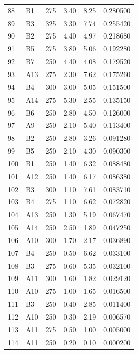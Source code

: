 \begin{longtable}{C{0.07\textwidth}C{0.08\textwidth}C{0.11\textwidth}C{0.18\textwidth}C{0.18\textwidth}C{0.18\textwidth}}
88 & B1 & 275 & 3.40 & 8.25 & 0.280500 \\
89 & B3 & 325 & 3.30 & 7.74 & 0.255420 \\
90 & B2 & 275 & 4.40 & 4.97 & 0.218680 \\
91 & B5 & 275 & 3.80 & 5.06 & 0.192280 \\
92 & B7 & 250 & 4.40 & 4.08 & 0.179520 \\
93 & A13 & 275 & 2.30 & 7.62 & 0.175260 \\
94 & B4 & 300 & 3.00 & 5.05 & 0.151500 \\
95 & A14 & 275 & 5.30 & 2.55 & 0.135150 \\
96 & B6 & 250 & 2.80 & 4.50 & 0.126000 \\
97 & A9 & 250 & 2.10 & 5.40 & 0.113400 \\
98 & B2 & 250 & 2.80 & 3.26 & 0.091280 \\
99 & B5 & 250 & 2.10 & 4.30 & 0.090300 \\
100 & B1 & 250 & 1.40 & 6.32 & 0.088480 \\
101 & A12 & 250 & 1.40 & 6.17 & 0.086380 \\
102 & B3 & 300 & 1.10 & 7.61 & 0.083710 \\
103 & B4 & 275 & 1.10 & 6.62 & 0.072820 \\
104 & A13 & 250 & 1.30 & 5.19 & 0.067470 \\
105 & A14 & 250 & 2.50 & 1.89 & 0.047250 \\
106 & A10 & 300 & 1.70 & 2.17 & 0.036890 \\
107 & B4 & 250 & 0.50 & 6.62 & 0.033100 \\
108 & B3 & 275 & 0.60 & 5.35 & 0.032100 \\
109 & A11 & 300 & 1.60 & 1.82 & 0.029120 \\
110 & A10 & 275 & 1.00 & 1.65 & 0.016500 \\
111 & B3 & 250 & 0.40 & 2.85 & 0.011400 \\
112 & A10 & 250 & 0.30 & 2.19 & 0.006570 \\
113 & A11 & 275 & 0.50 & 1.00 & 0.005000 \\
114 & A11 & 250 & 0.20 & 0.10 & 0.000200 \\
\bottomrule
\end{longtable}
